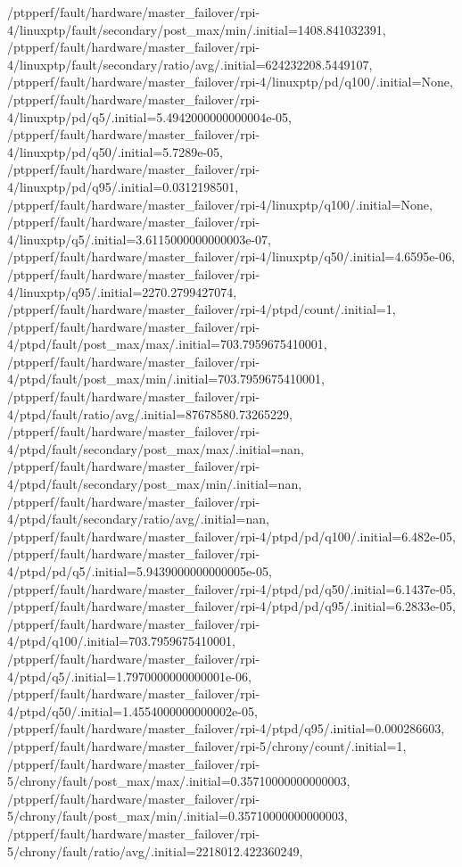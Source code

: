 {    /ptpperf/fault/hardware/master_failover/rpi-4/linuxptp/fault/secondary/post_max/min/.initial=1408.841032391,
    /ptpperf/fault/hardware/master_failover/rpi-4/linuxptp/fault/secondary/ratio/avg/.initial=624232208.5449107,
    /ptpperf/fault/hardware/master_failover/rpi-4/linuxptp/pd/q100/.initial=None,
    /ptpperf/fault/hardware/master_failover/rpi-4/linuxptp/pd/q5/.initial=5.4942000000000004e-05,
    /ptpperf/fault/hardware/master_failover/rpi-4/linuxptp/pd/q50/.initial=5.7289e-05,
    /ptpperf/fault/hardware/master_failover/rpi-4/linuxptp/pd/q95/.initial=0.0312198501,
    /ptpperf/fault/hardware/master_failover/rpi-4/linuxptp/q100/.initial=None,
    /ptpperf/fault/hardware/master_failover/rpi-4/linuxptp/q5/.initial=3.6115000000000003e-07,
    /ptpperf/fault/hardware/master_failover/rpi-4/linuxptp/q50/.initial=4.6595e-06,
    /ptpperf/fault/hardware/master_failover/rpi-4/linuxptp/q95/.initial=2270.2799427074,
    /ptpperf/fault/hardware/master_failover/rpi-4/ptpd/count/.initial=1,
    /ptpperf/fault/hardware/master_failover/rpi-4/ptpd/fault/post_max/max/.initial=703.7959675410001,
    /ptpperf/fault/hardware/master_failover/rpi-4/ptpd/fault/post_max/min/.initial=703.7959675410001,
    /ptpperf/fault/hardware/master_failover/rpi-4/ptpd/fault/ratio/avg/.initial=87678580.73265229,
    /ptpperf/fault/hardware/master_failover/rpi-4/ptpd/fault/secondary/post_max/max/.initial=nan,
    /ptpperf/fault/hardware/master_failover/rpi-4/ptpd/fault/secondary/post_max/min/.initial=nan,
    /ptpperf/fault/hardware/master_failover/rpi-4/ptpd/fault/secondary/ratio/avg/.initial=nan,
    /ptpperf/fault/hardware/master_failover/rpi-4/ptpd/pd/q100/.initial=6.482e-05,
    /ptpperf/fault/hardware/master_failover/rpi-4/ptpd/pd/q5/.initial=5.9439000000000005e-05,
    /ptpperf/fault/hardware/master_failover/rpi-4/ptpd/pd/q50/.initial=6.1437e-05,
    /ptpperf/fault/hardware/master_failover/rpi-4/ptpd/pd/q95/.initial=6.2833e-05,
    /ptpperf/fault/hardware/master_failover/rpi-4/ptpd/q100/.initial=703.7959675410001,
    /ptpperf/fault/hardware/master_failover/rpi-4/ptpd/q5/.initial=1.7970000000000001e-06,
    /ptpperf/fault/hardware/master_failover/rpi-4/ptpd/q50/.initial=1.4554000000000002e-05,
    /ptpperf/fault/hardware/master_failover/rpi-4/ptpd/q95/.initial=0.000286603,
    /ptpperf/fault/hardware/master_failover/rpi-5/chrony/count/.initial=1,
    /ptpperf/fault/hardware/master_failover/rpi-5/chrony/fault/post_max/max/.initial=0.35710000000000003,
    /ptpperf/fault/hardware/master_failover/rpi-5/chrony/fault/post_max/min/.initial=0.35710000000000003,
    /ptpperf/fault/hardware/master_failover/rpi-5/chrony/fault/ratio/avg/.initial=2218012.422360249,
}
